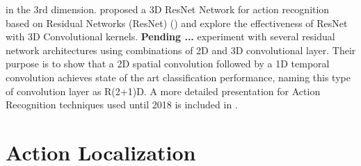 \documentclass{report}
\begin{document}
in the 3rd dimension. \cite{DBLP:journals/corr/abs-1708-07632} proposed a 3D ResNet Network for action recognition based on Residual Networks (ResNet)
(\cite{DBLP:journals/corr/HeZRS15}) and explore the effectiveness of ResNet with 3D Convolutional kernels.
\cite{DBLP:journals/corr/abs-1711-08200} \textbf{Pending ...} \cite{DBLP:journals/corr/abs-1711-11248}
experiment with several residual network architectures using combinations of 2D and 3D convolutional layer. Their purpose is
to show that a 2D spatial convolution followed by a 1D temporal convolution achieves state of the art classification performance, naming
this type of convolution layer as R(2+1)D. A more detailed presentation for Action Recognition techniques used until 2018 is included in
\cite{DBLP:journals/corr/abs-1806-11230}.

\section{Action Localization}
\end{document}
